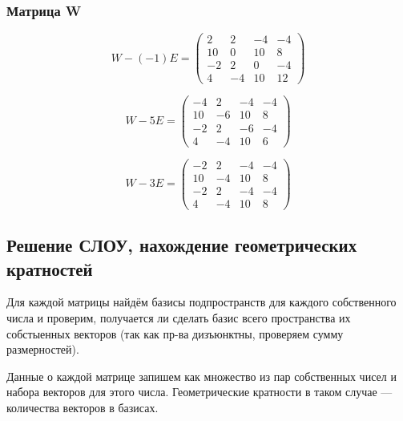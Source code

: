 \documentclass[12pt, a4paper]{article}
\begin{document}
    \subsubsection{Матрица W}

    \begin{equation}
        W - (-1) E = \left(\begin{matrix}
            2 & 2 & -4 & -4 \\
            10 & 0 & 10 & 8 \\
            -2 & 2 & 0 & -4 \\
            4 & -4 & 10 & 12
        \end{matrix}\right)
    \end{equation}

    \begin{equation}
        W - 5 E = \left(\begin{matrix}
            -4 & 2 & -4 & -4 \\
            10 & -6 & 10 & 8 \\
            -2 & 2 & -6 & -4 \\
            4 & -4 & 10 & 6
        \end{matrix}\right)
    \end{equation}

    \begin{equation}
        W - 3 E = \left(\begin{matrix}
            -2 & 2 & -4 & -4 \\
            10 & -4 & 10 & 8 \\
            -2 & 2 & -4 & -4 \\
            4 & -4 & 10 & 8
        \end{matrix}\right)
    \end{equation}


    \subsection{Решение СЛОУ, нахождение геометрических кратностей}
    
    Для каждой матрицы найдём базисы подпространств 
    для каждого собственного числа и проверим, 
    получается ли сделать базис всего пространства их собстыенных векторов
    (так как пр-ва дизъюнктны, проверяем сумму размерностей).

    Данные о каждой матрице запишем как множество из пар собственных чисел
    и набора векторов для этого числа. Геометрические кратности в таком случае — количества векторов в базисах.
\end{document}
